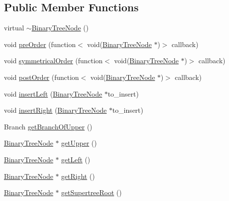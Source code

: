 \subsection*{Public Member Functions}
\begin{DoxyCompactItemize}
\item 
virtual \hyperlink{classDataJuggler_1_1BinaryTreeNode_af2995ef47057ef14f617af026998afc1}{$\sim$\+Binary\+Tree\+Node} ()
\item 
void \hyperlink{classDataJuggler_1_1BinaryTreeNode_a39df9c1d2ae67bb35323548e83601bd4}{pre\+Order} (function$<$ void(\hyperlink{classDataJuggler_1_1BinaryTreeNode}{Binary\+Tree\+Node} $\ast$)$>$ callback)
\item 
void \hyperlink{classDataJuggler_1_1BinaryTreeNode_a082f4223f8d7d40c5e85a9f2322a2b22}{symmetrical\+Order} (function$<$ void(\hyperlink{classDataJuggler_1_1BinaryTreeNode}{Binary\+Tree\+Node} $\ast$)$>$ callback)
\item 
void \hyperlink{classDataJuggler_1_1BinaryTreeNode_ad52d331c7d393615f76bb18657dc7c0b}{post\+Order} (function$<$ void(\hyperlink{classDataJuggler_1_1BinaryTreeNode}{Binary\+Tree\+Node} $\ast$)$>$ callback)
\item 
void \hyperlink{classDataJuggler_1_1BinaryTreeNode_a65f216d77e7953f02dfa4bc293fd8993}{insert\+Left} (\hyperlink{classDataJuggler_1_1BinaryTreeNode}{Binary\+Tree\+Node} $\ast$to\+\_\+insert)
\item 
void \hyperlink{classDataJuggler_1_1BinaryTreeNode_ac59067ab56902eafb5b7c541276c294c}{insert\+Right} (\hyperlink{classDataJuggler_1_1BinaryTreeNode}{Binary\+Tree\+Node} $\ast$to\+\_\+insert)
\item 
Branch \hyperlink{classDataJuggler_1_1BinaryTreeNode_a98ff5ed818a8a679979adaae76fcbd8a}{get\+Branch\+Of\+Upper} ()
\item 
\hyperlink{classDataJuggler_1_1BinaryTreeNode}{Binary\+Tree\+Node} $\ast$ \hyperlink{classDataJuggler_1_1BinaryTreeNode_a07f3536b32e66d434b426f2d4903710a}{get\+Upper} ()
\item 
\hyperlink{classDataJuggler_1_1BinaryTreeNode}{Binary\+Tree\+Node} $\ast$ \hyperlink{classDataJuggler_1_1BinaryTreeNode_a9c7bf23457f5a2a39a6b7e5525604e68}{get\+Left} ()
\item 
\hyperlink{classDataJuggler_1_1BinaryTreeNode}{Binary\+Tree\+Node} $\ast$ \hyperlink{classDataJuggler_1_1BinaryTreeNode_a0d7d9c5d8cd5033e12f78dfbcb9667a1}{get\+Right} ()
\item 
\hyperlink{classDataJuggler_1_1BinaryTreeNode}{Binary\+Tree\+Node} $\ast$ \hyperlink{classDataJuggler_1_1BinaryTreeNode_a257b78d609886933af1ceabb8c5880b0}{get\+Supertree\+Root} ()

\end{DoxyCompactItemize}
